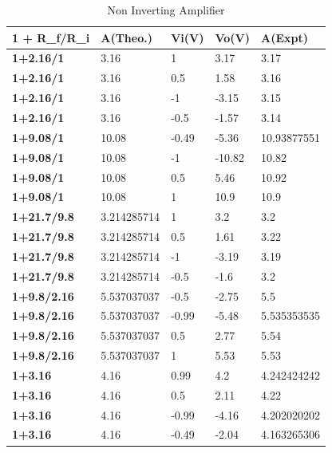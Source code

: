 \documentclass{scrartcl}
\newcommand{\1}{\mathbbm{1}}
\begin{document}
\begin{table}[!ht]
    \centering
    \caption{Non Inverting Amplifier}
    \begin{tabular}{|l|l|l|l|l|}
    \hline
        \textbf{1 + R\_f/R\_i} & \textbf{A(Theo.)} & \textbf{Vi(V)} & \textbf{Vo(V)} & \textbf{A(Expt)} \\ \hline
        \textbf{1+2.16/1} & 3.16 & 1 & 3.17 & 3.17 \\ \hline
        \textbf{1+2.16/1} & 3.16 & 0.5 & 1.58 & 3.16 \\ \hline
        \textbf{1+2.16/1} & 3.16 & -1 & -3.15 & 3.15 \\ \hline
        \textbf{1+2.16/1} & 3.16 & -0.5 & -1.57 & 3.14 \\ \hline
        \textbf{1+9.08/1} & 10.08 & -0.49 & -5.36 & 10.93877551 \\ \hline
        \textbf{1+9.08/1} & 10.08 & -1 & -10.82 & 10.82 \\ \hline
        \textbf{1+9.08/1} & 10.08 & 0.5 & 5.46 & 10.92 \\ \hline
        \textbf{1+9.08/1} & 10.08 & 1 & 10.9 & 10.9 \\ \hline
        \textbf{1+21.7/9.8} & 3.214285714 & 1 & 3.2 & 3.2 \\ \hline
        \textbf{1+21.7/9.8} & 3.214285714 & 0.5 & 1.61 & 3.22 \\ \hline
        \textbf{1+21.7/9.8} & 3.214285714 & -1 & -3.19 & 3.19 \\ \hline
        \textbf{1+21.7/9.8} & 3.214285714 & -0.5 & -1.6 & 3.2 \\ \hline
        \textbf{1+9.8/2.16} & 5.537037037 & -0.5 & -2.75 & 5.5 \\ \hline
        \textbf{1+9.8/2.16} & 5.537037037 & -0.99 & -5.48 & 5.535353535 \\ \hline
        \textbf{1+9.8/2.16} & 5.537037037 & 0.5 & 2.77 & 5.54 \\ \hline
        \textbf{1+9.8/2.16} & 5.537037037 & 1 & 5.53 & 5.53 \\ \hline
        \textbf{1+3.16} & 4.16 & 0.99 & 4.2 & 4.242424242 \\ \hline
        \textbf{1+3.16} & 4.16 & 0.5 & 2.11 & 4.22 \\ \hline
        \textbf{1+3.16} & 4.16 & -0.99 & -4.16 & 4.202020202 \\ \hline
        \textbf{1+3.16} & 4.16 & -0.49 & -2.04 & 4.163265306 \\ \hline
    \end{tabular}
    \label{noninv}
\end{table}
\end{document}
